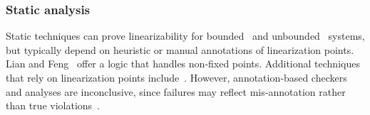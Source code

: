 

\subsubsection{Static analysis}

Static techniques can prove linearizability for bounded~\cite{AmRiReSaYa07,BeLeMaRaSa08,MaLeSaRaBe08} and unbounded~\cite{BeLeMaRaSa08,Va09,Va10} systems, but typically depend on heuristic or manual annotations of linearization points. Lian and Feng~\cite{LiFe13} offer a logic that handles non‐fixed points. Additional techniques that rely on linearization points include~\cite{OhRiVeYaYo10,ZhPeHa15,AbJoTr16}. 
However, annotation‐based checkers and analyses are inconclusive, since failures may reflect mis‐annotation rather than true violations~\cite{BoEmCoHa15}.


%
%

